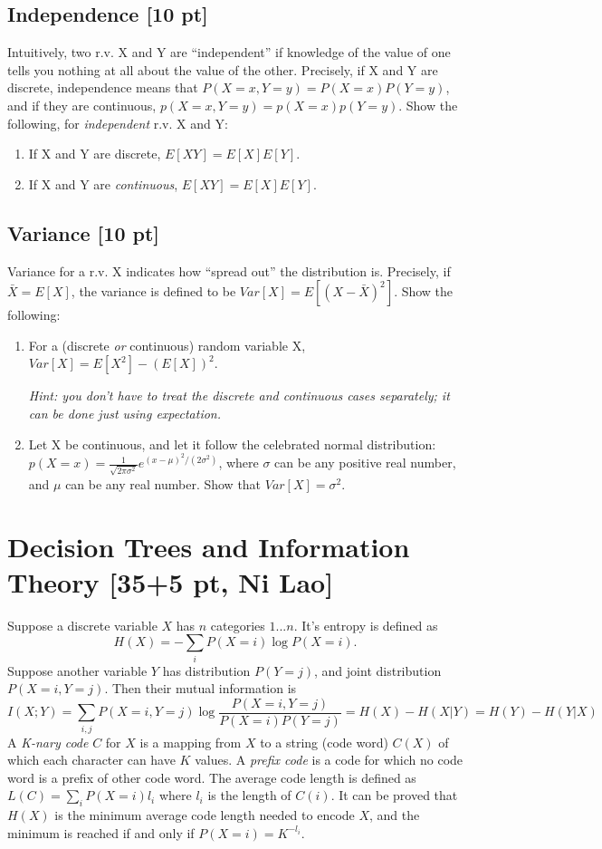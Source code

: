 \documentclass[11pt]{article}
\begin{document}
\subsection{Independence [10 pt]}
Intuitively, two r.v. X and Y are ``independent'' if knowledge of the value of
one tells you nothing at all about the value of the other. Precisely, if X and
Y are discrete, independence means that $P(X=x,Y=y)=P(X=x)P(Y=y)$, and if they are continuous,
$p(X=x,Y=y)=p(X=x)p(Y=y)$.  Show the following, for \emph{independent} r.v. X
and Y:
\begin{enumerate}
\item If X and Y are discrete, $E[XY]=E[X]E[Y]$.
\item If X and Y are \emph{continuous}, $E[XY]=E[X]E[Y]$.
\end{enumerate}

\subsection{Variance [10 pt]}
Variance for a r.v. X indicates how ``spread out'' the distribution is.
Precisely, if $\bar{X}=E[X]$, the variance is defined to be
$Var[X]=E[(X-\bar{X})^2]$. Show the following:
\begin{enumerate}
\item For a (discrete \emph{or} continuous) random variable X,
    $Var[X]=E[X^2]-(E[X])^2$.

    \emph{Hint: you don't have to treat
    the discrete and continuous cases separately; it can be done
    just using expectation.}
\item Let X be continuous, and let it follow the celebrated
    normal distribution: $p(X=x)=\frac{1}{\sqrt{2\pi \sigma^2}}e^{(x-\mu)^2/(2\sigma^2)}$,
    where $\sigma$ can be any positive real number, and $\mu$ can be
    any real number.  Show that $Var[X]=\sigma^2$.
\end{enumerate}


\section{Decision Trees and Information Theory [35+5 pt, Ni Lao]}
Suppose a discrete variable $X$ has $n$ categories $1...n$. It's entropy is defined as \begin{displaymath}
H(X)=-\sum_i {P(X=i)\log{P(X=i)}}.
\end{displaymath}
Suppose another variable $Y$ has distribution $P(Y=j)$, and
joint distribution $P(X=i,Y=j)$. Then their mutual information is
\begin{displaymath}
I(X;Y)=\sum_{i,j} P(X=i,Y=j) \log \frac{P(X=i,Y=j)}{P(X=i) P(Y=j)}=H(X)-H(X|Y)=H(Y)-H(Y|X)
\end{displaymath}
A \textit{K-nary code} $C$ for $X$ is a mapping from $X$ to a string
(code word) $C(X)$ of which each character can have $K$ values. A
\textit{prefix code} is a code for which no code word is a prefix of
other code word. The average code length is defined as $L(C)=\sum_i {P(X=i) l_i}$
where $l_i$ is the length of $C(i)$. It can be proved that $H(X)$ is
the minimum average code length needed to encode $X$, and the
minimum is reached if and only if $P(X=i)= K^{-l_i}$.
\end{document}
